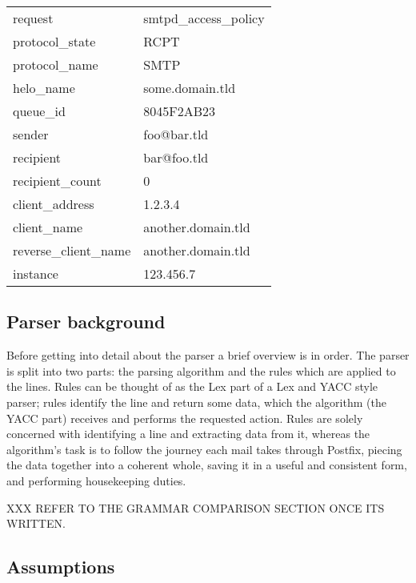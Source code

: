 \documentclass[a4paper,12pt,draft]{article}
\begin{document}
\begin{tabular}[]{ll}

    request                 & smtpd\_access\_policy     \\
    protocol\_state         & RCPT                      \\
    protocol\_name          & SMTP                      \\
    helo\_name              & some.domain.tld           \\
    queue\_id               & 8045F2AB23                \\
    sender                  & foo@bar.tld               \\
    recipient               & bar@foo.tld               \\
    recipient\_count        & 0                         \\
    client\_address         & 1.2.3.4                   \\
    client\_name            & another.domain.tld        \\
    reverse\_client\_name   & another.domain.tld        \\
    instance                & 123.456.7                 \\

\end{tabular}



\subsection{Parser background}

Before getting into detail about the parser a brief overview is in order.
The parser is split into two parts: the parsing algorithm and the rules
which are applied to the lines.  Rules can be thought of as the Lex part of
a Lex and YACC style parser; rules identify the line and return some data,
which the algorithm (the YACC part) receives and performs the requested
action.  Rules are solely concerned with identifying a line and extracting
data from it, whereas the algorithm's task is to follow the journey each
mail takes through Postfix, piecing the data together into a coherent
whole, saving it in a useful and consistent form, and performing
housekeeping duties.

XXX REFER TO THE GRAMMAR COMPARISON SECTION ONCE ITS WRITTEN.

\subsection{Assumptions}
\end{document}
